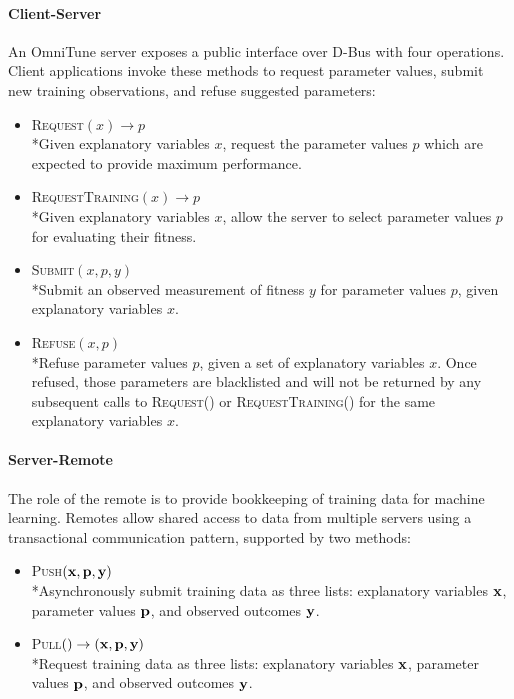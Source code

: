 \documentclass[nonatbib,preprint,9pt]{sigplanconf}
\begin{document}
\paragraph{Client-Server} An OmniTune server exposes a public
interface over D-Bus with four operations. Client applications invoke
these methods to request parameter values, submit new training
observations, and refuse suggested parameters:
%
\begin{itemize}
\item \textsc{Request}$(x) \to p$\\*Given explanatory variables $x$,
  request the parameter values $p$ which are expected to provide
  maximum performance.
\item \textsc{RequestTraining}$(x) \to p$\\*Given explanatory
  variables $x$, allow the server to select parameter values $p$ for
  evaluating their fitness.
\item \textsc{Submit}$(x, p, y)$\\*Submit an observed measurement of
  fitness $y$ for parameter values $p$, given explanatory variables
  $x$.
\item \textsc{Refuse}$(x, p)$\\*Refuse parameter values $p$, given a
  set of explanatory variables $x$. Once refused, those parameters are
  blacklisted and will not be returned by any subsequent calls to
  \textsc{Request()} or \textsc{RequestTraining()} for the same
  explanatory variables $x$.
\end{itemize}
%

\paragraph{Server-Remote} The role of the remote is to provide
bookkeeping of training data for machine learning. Remotes allow
shared access to data from multiple servers using a transactional
communication pattern, supported by two methods:
%
\begin{itemize}
\item \textsc{Push}$(\bf{x}, \bf{p}, \bf{y})$\\*Asynchronously submit
  training data as three lists: explanatory variables $\bf{x}$,
  parameter values $\bf{p}$, and observed outcomes $\bf{y}$.
\item \textsc{Pull}$() \to (\bf{x}, \bf{p}, \bf{y})$\\*Request
  training data as three lists: explanatory variables $\bf{x}$,
  parameter values $\bf{p}$, and observed outcomes $\bf{y}$.
\end{itemize}
\end{document}
